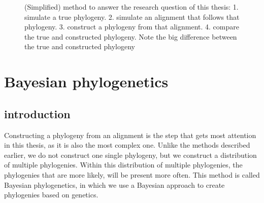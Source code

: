 {\begin{figure}[H]
{
  }
  \caption{
    (Simplified) method to answer the research question of this thesis:
    1. simulate a true phylogeny. 
    2. simulate an alignment that follows that phylogeny. 
    3. construct a phylogeny from that alignment.
    4. compare the true and constructed phylogeny.
    Note the big difference between the true and constructed phylogeny
  }
  \label{fig:research_workflow_single}
\end{figure}


\section{Bayesian phylogenetics}



\subsection{introduction}

Constructing a phylogeny from an alignment is the step that
gets most attention in this thesis, as it is also the most complex
one. Unlike the methods described earlier, 
we do not construct one single phylogeny, 
but we construct a distribution of multiple phylogenies.
Within this distribution of multiple phylogenies, the phylogenies
that are more likely, will be present more often.
This method is called Bayesian phylogenetics, in which we use
a Bayesian approach to create phylogenies based on genetics.

}
